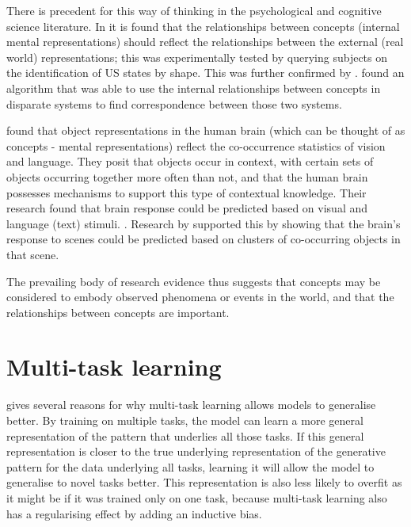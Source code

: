 There is precedent for this way of thinking in the psychological and cognitive science literature. In \cite{SHEPARD19701} it is found that the relationships between concepts (internal mental representations) should reflect the relationships between the external (real world) representations; this was experimentally tested by querying subjects on the identification of US states by shape. This was further confirmed by \cite{SecondOrderIsomorphismFaces}. \cite{GOLDSTONE2002295} found an algorithm that was able to use the internal relationships between concepts in disparate systems to find correspondence between those two systems. 

\cite{CoocurrenceVisionLanguage2021} found that object representations in the human brain (which can be thought of as concepts - mental representations) reflect the co-occurrence statistics of vision and language. They posit that objects occur in context, with certain sets of objects occurring together more often than not, and that the human brain possesses mechanisms to support this type of contextual knowledge. Their research found that brain response could be predicted based on visual and language (text) stimuli. . Research by \cite{STANSBURY20131025} supported this by showing that the brain's response to scenes could be predicted based on clusters of co-occurring objects in that scene. 

The prevailing body of research evidence thus suggests that concepts may be considered to embody observed phenomena or events in the world, and that the relationships between concepts are important. 

\section{Multi-task learning}

\cite{OverviewMultiTaskLearning} gives several reasons for why multi-task learning allows models to generalise better. By training on multiple tasks, the model can learn a more general representation of the pattern that underlies all those tasks. If this general representation is closer to the true underlying representation of the generative pattern for the data underlying all tasks, learning it will allow the model to generalise to novel tasks better. This representation is also less likely to overfit as it might be if it was trained only on one task, because multi-task learning also has a regularising effect by adding an inductive bias. 


